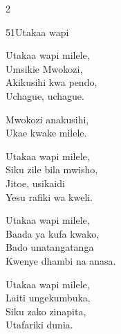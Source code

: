 \documentclass{article}
\begin{document}
\begin{multicols}{2}
\begin{hymn}{51}{Utakaa wapi}{}
\begin{stanza}
Utakaa wapi milele,\\
Umsikie Mwokozi,\\
Akikusihi kwa pendo,\\
Uchague, uchague.
\end{stanza}
\begin{chorus}
Mwokozi anakusihi,\\
Ukae kwake milele.
\end{chorus}
\begin{stanza}
Utakaa wapi milele,\\
Siku zile bila mwisho,\\
Jitoe, usikaidi\\
Yesu rafiki wa kweli.
\end{stanza}
\begin{stanza}
Utakaa wapi milele,\\
Baada ya kufa kwako,\\
Bado unatangatanga\\
Kwenye dhambi na anasa.
\end{stanza}
\begin{stanza}
Utakaa wapi milele,\\
Laiti ungekumbuka,\\
Siku zako zinapita,\\
Utafariki dunia.
\end{stanza}
\end{hymn}


\end{multicols}
\end{document}
